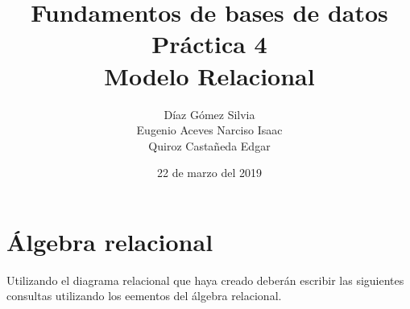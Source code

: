 \documentclass{article}
\begin{document}
    \title{
        Fundamentos de bases de datos \\
        Práctica 4 \\
        Modelo Relacional
    }
    \author{
        Díaz Gómez Silvia \\
        Eugenio Aceves Narciso Isaac \\
        Quiroz Castañeda Edgar
    }
    \date {
        22 de marzo del 2019    
    }
    \maketitle

    \section{Álgebra relacional}
    Utilizando el diagrama relacional que haya creado deberán escribir las
    siguientes consultas utilizando los eementos del álgebra relacional.
\end{document}
